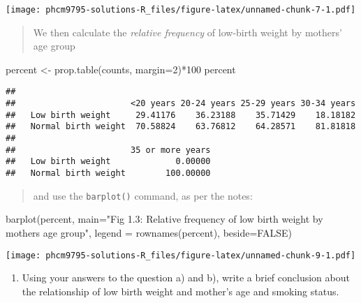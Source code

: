 \documentclass[
]{memoir}
\newenvironment{Shaded}{\begin{snugshade}}{\end{snugshade}}
\newcommand{\AttributeTok}[1]{\textcolor[rgb]{0.77,0.63,0.00}{#1}}
\newcommand{\ConstantTok}[1]{\textcolor[rgb]{0.00,0.00,0.00}{#1}}
\newcommand{\DecValTok}[1]{\textcolor[rgb]{0.00,0.00,0.81}{#1}}
\newcommand{\FunctionTok}[1]{\textcolor[rgb]{0.00,0.00,0.00}{#1}}
\newcommand{\NormalTok}[1]{#1}
\newcommand{\OtherTok}[1]{\textcolor[rgb]{0.56,0.35,0.01}{#1}}
\newcommand{\SpecialCharTok}[1]{\textcolor[rgb]{0.00,0.00,0.00}{#1}}
\newcommand{\StringTok}[1]{\textcolor[rgb]{0.31,0.60,0.02}{#1}}
\providecommand{\tightlist}{%
  \setlength{\itemsep}{0pt}\setlength{\parskip}{0pt}}
\begin{document}
\texttt{[image: phcm9795-solutions-R\_files/figure-latex/unnamed-chunk-7-1.pdf]}

\begin{quote}
We then calculate the \emph{relative frequency} of low-birth weight by mothers' age group
\end{quote}

\begin{Shaded}
\begin{Highlighting}[]
\NormalTok{percent }\OtherTok{\textless{}{-}} \FunctionTok{prop.table}\NormalTok{(counts, }\AttributeTok{margin=}\DecValTok{2}\NormalTok{)}\SpecialCharTok{*}\DecValTok{100}
\NormalTok{percent}
\end{Highlighting}
\end{Shaded}

\begin{verbatim}
##                      
##                       <20 years 20-24 years 25-29 years 30-34 years
##   Low birth weight     29.41176    36.23188    35.71429    18.18182
##   Normal birth weight  70.58824    63.76812    64.28571    81.81818
##                      
##                       35 or more years
##   Low birth weight             0.00000
##   Normal birth weight        100.00000
\end{verbatim}

\begin{quote}
and use the \texttt{barplot()} command, as per the notes:
\end{quote}

\begin{Shaded}
\begin{Highlighting}[]
\FunctionTok{barplot}\NormalTok{(percent, }
        \AttributeTok{main=}\StringTok{"Fig 1.3: Relative frequency of low birth weight by mother\textquotesingle{}s age group"}\NormalTok{,}
        \AttributeTok{legend =} \FunctionTok{rownames}\NormalTok{(percent), }\AttributeTok{beside=}\ConstantTok{FALSE}\NormalTok{)}
\end{Highlighting}
\end{Shaded}

\texttt{[image: phcm9795-solutions-R\_files/figure-latex/unnamed-chunk-9-1.pdf]}

\begin{enumerate}
\def\labelenumi{\alph{enumi})}
\setcounter{enumi}{3}
\tightlist
\item
  Using your answers to the question a) and b), write a brief conclusion about the relationship of low birth weight and mother's age and smoking status.
\end{enumerate}
\end{document}

